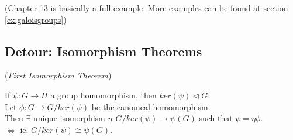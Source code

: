 \documentclass{article}
\theoremstyle{definition}
\newenvironment{thm}[1]
{\renewcommand\theinnerthm{#1}\innerthm}
{\endinnerthm}
\begin{document}
(Chapter 13 is basically a full example. More examples can be found at section \ref{ex:galoisgroups})


\subsection{Detour: Isomorphism Theorems}
\begin{thm}{i.1}(\emph{First Isomorphism Theorem}) \label{1stisothm}

  \begin{minipage}{0.75\textwidth}
  If $\psi: G \longrightarrow H$ a group homomorphism, then $ker(\psi) \triangleleft G$.\\
  Let $\phi: G \longrightarrow G/ker(\psi)$ be the canonical homomorphism.\\
  Then $\exists$ unique isomorphism $\eta: G/ker(\psi) \longrightarrow \psi(G)$ such that $\psi = \eta \phi$.\\
  $\Longleftrightarrow$ ie. $G/ker(\psi) \cong \psi(G)$.
  \end{minipage}
\hfill
\begin{minipage}{0.2\textwidth}
\end{minipage}
\end{thm}
\end{document}
